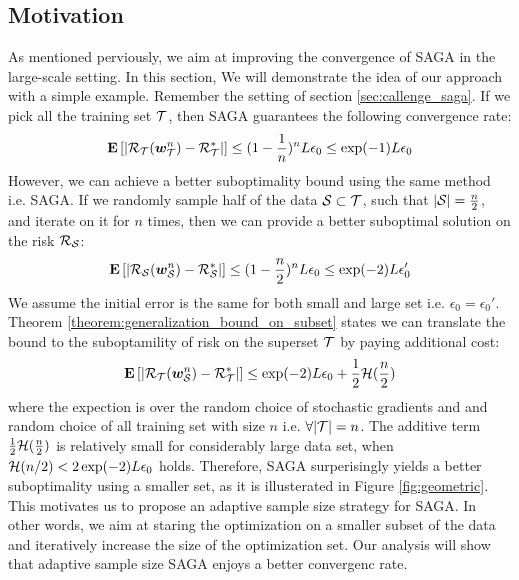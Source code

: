 \subsection{Motivation}
As mentioned perviously, we aim at improving the
convergence of SAGA in the large-scale setting. In this section, We
will demonstrate the idea of our approach with a simple example. Remember the
setting of section \ref{sec:callenge_saga}.
 If we pick all the training set $\T$, then SAGA guarantees the following
 convergence rate:
 \begin{equation*}
 	\E \left[|\risk_{\T}( \w_{\T}^n) - \risk^*_{\T}|\right] \leq 
 	(1-\frac{1}{n})^n L \epsilon_0 \leq \exp(-1) L\epsilon_0
 \end{equation*}
However, we can achieve a better suboptimality bound using the same method i.e.
SAGA. If we randomly sample half of the data $\S \subset \T$, such that $|\S| =
\frac{n}{2}$, and iterate on it for $n$ times, then we can provide a better
suboptimal solution on the risk $\risk_{\S}$: 
\begin{equation*}
	\E \left[ |\risk_{\S}( \w_{\S}^n) - \risk^*_{\S}|\right] \leq (1-
	\frac{n}{2}) ^n L \epsilon_0 \leq \exp(-2) L \epsilon_0'
\end{equation*}
We assume the initial error is the same for both small and large set i.e.
$\epsilon_0 = \epsilon_0'$. Theorem
\ref{theorem:generalization_bound_on_subset} states we can translate the bound
to the suboptamility of risk on the superset $\T$ by paying additional cost: 
\begin{equation*}
	\E \left[|\risk_{\T} (\w_{\S}^n) - \risk^*_{\T}| \right] \leq 
	\exp(-2) L \epsilon_0 + \frac{1}{2} \bound(\frac{n}{2})
\end{equation*}
where the expection is over the random choice of stochastic gradients and and random choice of all training set with size $n$ i.e.
$\forall |\T| = n$. The additive term $\frac{1}{2} \bound(\frac{n}{2})$ is
relatively small for considerably large data set, when $\bound(n/2)<2 \exp(-2) L\epsilon_0$ holds.
	Therefore, SAGA surperisingly yields a better
	suboptimality using a smaller set, as it is illusterated in Figure
	\ref{fig:geometric}. 
	This motivates us to propose an adaptive sample size strategy for SAGA.
	In other words, we aim at staring the optimization on a smaller subset of
	the data and iteratively increase the size of the optimization set.
	Our analysis will show that adaptive sample size SAGA enjoys a better convergenc rate. 
